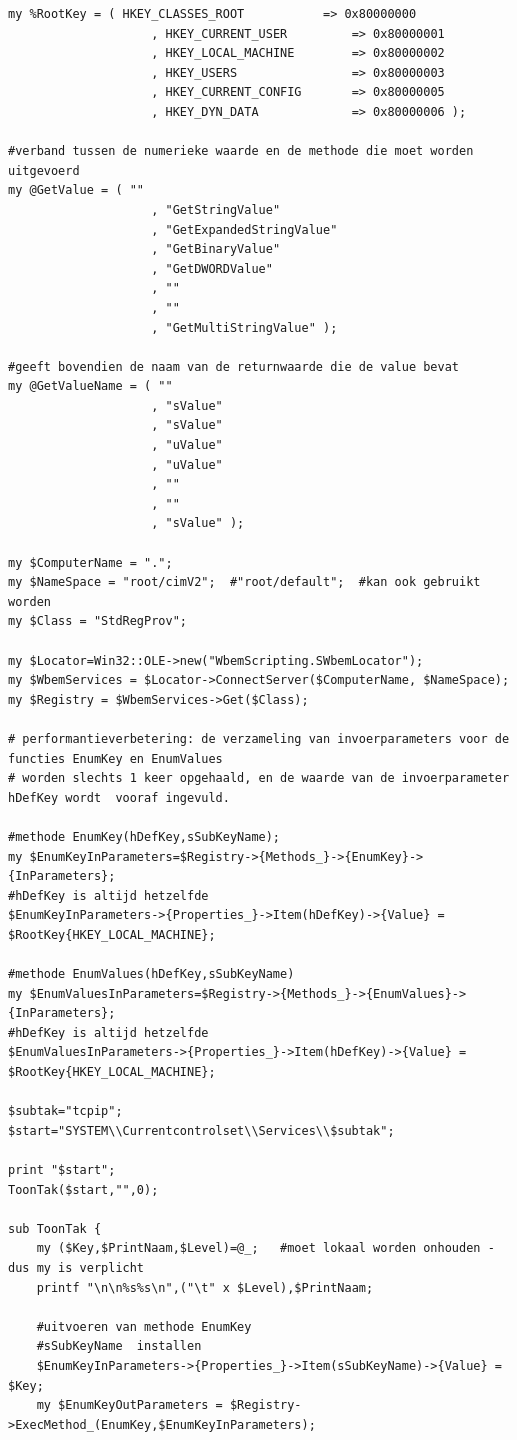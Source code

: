 \documentclass[11pt,a4paper]{report}
\begin{document}
\begin{enumerate}[resume]
\begin{lstlisting}
my %RootKey = ( HKEY_CLASSES_ROOT   		=> 0x80000000
					, HKEY_CURRENT_USER   		=> 0x80000001
					, HKEY_LOCAL_MACHINE  		=> 0x80000002
					, HKEY_USERS         		=> 0x80000003
					, HKEY_CURRENT_CONFIG 		=> 0x80000005
					, HKEY_DYN_DATA       		=> 0x80000006 );

#verband tussen de numerieke waarde en de methode die moet worden uitgevoerd
my @GetValue = ( ""
					, "GetStringValue"
					, "GetExpandedStringValue"
					, "GetBinaryValue"
					, "GetDWORDValue"
					, ""
					, ""
					, "GetMultiStringValue" );

#geeft bovendien de naam van de returnwaarde die de value bevat
my @GetValueName = ( ""
					, "sValue"
					, "sValue"
					, "uValue"
					, "uValue"
					, ""
					, ""
					, "sValue" );

my $ComputerName = ".";
my $NameSpace = "root/cimV2";  #"root/default";  #kan ook gebruikt worden
my $Class = "StdRegProv";

my $Locator=Win32::OLE->new("WbemScripting.SWbemLocator");
my $WbemServices = $Locator->ConnectServer($ComputerName, $NameSpace);
my $Registry = $WbemServices->Get($Class);

# performantieverbetering: de verzameling van invoerparameters voor de functies EnumKey en EnumValues
# worden slechts 1 keer opgehaald, en de waarde van de invoerparameter hDefKey wordt  vooraf ingevuld.

#methode EnumKey(hDefKey,sSubKeyName);
my $EnumKeyInParameters=$Registry->{Methods_}->{EnumKey}->{InParameters};
#hDefKey is altijd hetzelfde
$EnumKeyInParameters->{Properties_}->Item(hDefKey)->{Value} = $RootKey{HKEY_LOCAL_MACHINE};

#methode EnumValues(hDefKey,sSubKeyName)
my $EnumValuesInParameters=$Registry->{Methods_}->{EnumValues}->{InParameters};
#hDefKey is altijd hetzelfde
$EnumValuesInParameters->{Properties_}->Item(hDefKey)->{Value} = $RootKey{HKEY_LOCAL_MACHINE};

$subtak="tcpip";
$start="SYSTEM\\Currentcontrolset\\Services\\$subtak";

print "$start";
ToonTak($start,"",0);

sub ToonTak {
	my ($Key,$PrintNaam,$Level)=@_;   #moet lokaal worden onhouden - dus my is verplicht
	printf "\n\n%s%s\n",("\t" x $Level),$PrintNaam;
	
	#uitvoeren van methode EnumKey
	#sSubKeyName  installen
	$EnumKeyInParameters->{Properties_}->Item(sSubKeyName)->{Value} = $Key;
	my $EnumKeyOutParameters = $Registry->ExecMethod_(EnumKey,$EnumKeyInParameters);
	

\end{lstlisting}
\end{enumerate}
\end{document}
